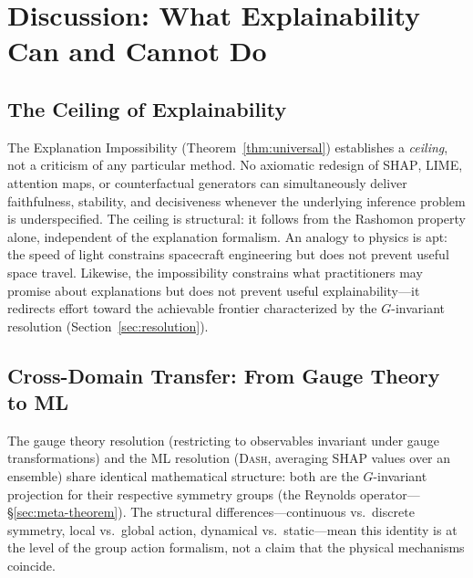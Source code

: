 \documentclass[11pt,a4paper]{article}
\newcommand{\SHAP}{\textsc{SHAP}}
\newcommand{\DASH}{\textsc{Dash}}
\begin{document}
\section{Discussion: What Explainability Can and Cannot Do}
\label{sec:discussion}

\subsection{The Ceiling of Explainability}
\label{sec:ceiling}

The Explanation Impossibility (Theorem~\ref{thm:universal}) establishes
a \emph{ceiling}, not a criticism of any particular method.  No axiomatic
redesign of \SHAP{}, LIME, attention maps, or counterfactual generators can
simultaneously deliver faithfulness, stability, and decisiveness whenever the
underlying inference problem is underspecified.  The ceiling is structural: it
follows from the Rashomon property alone, independent of the explanation
formalism.  An analogy to physics is apt: the speed of light constrains
spacecraft engineering but does not prevent useful space travel.  Likewise, the
impossibility constrains what practitioners may promise about explanations but
does not prevent useful explainability---it redirects effort toward the
achievable frontier characterized by the $G$-invariant resolution
(Section~\ref{sec:resolution}).

\subsection{Cross-Domain Transfer: From Gauge Theory to ML}
\label{sec:transfer}

The gauge theory resolution (restricting to observables invariant under gauge transformations) and the ML resolution (\DASH{}, averaging SHAP values over an ensemble) share identical mathematical structure: both are the $G$-invariant projection for their respective symmetry groups (the Reynolds operator---\S\ref{sec:meta-theorem}). The structural differences---continuous vs.\ discrete symmetry, local vs.\ global action, dynamical vs.\ static---mean this identity is at the level of the group action formalism, not a claim that the physical mechanisms coincide.
\end{document}
